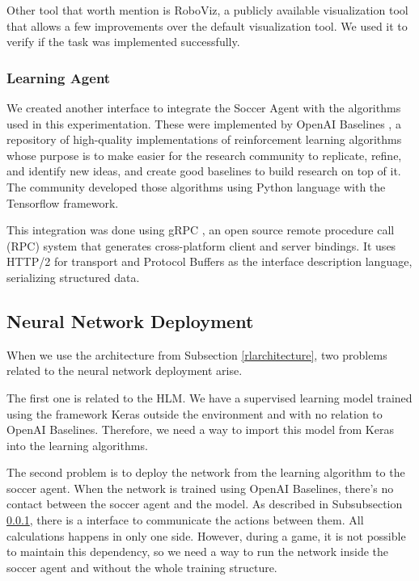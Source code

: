 Other tool that worth mention is RoboViz, a publicly available visualization tool that allows a few improvements over the default visualization tool. We used it to verify if the task was implemented successfully.

\subsubsection{Learning Agent}\label{learningagent}

We created another interface to integrate the Soccer Agent with the algorithms used in this experimentation. These were implemented by OpenAI Baselines \cite{baselines}, a repository of high-quality implementations of reinforcement learning algorithms whose purpose is to make easier for the research community to replicate, refine, and identify new ideas, and create good baselines to build research on top of it. The community developed those algorithms using Python language with the Tensorflow \cite{tensorflow2015-whitepaper} framework.

This integration was done using gRPC \cite{grpc}, an open source remote procedure call (RPC) system that generates cross-platform client and server bindings. It uses HTTP/2 for transport and Protocol Buffers \cite{protocolbuffers} as the interface description language, serializing structured data.




\subsection{Neural Network Deployment}

When we use the architecture from Subsection \ref{rlarchitecture}, two problems related to the neural network deployment arise.

The first one is related to the HLM. We have a supervised learning model trained using the framework Keras outside the environment and with no relation to OpenAI Baselines. Therefore, we need a way to import this model from Keras into the learning algorithms.

The second problem is to deploy the network from the learning algorithm to the soccer agent. When the network is trained using OpenAI Baselines, there's no contact between the soccer agent and the model. As described in Subsubsection \ref{learningagent}, there is a interface to communicate the actions between them. All calculations happens in only one side. However, during a game, it is not possible to maintain this dependency, so we need a way to run the network inside the soccer agent and without the whole training structure.

